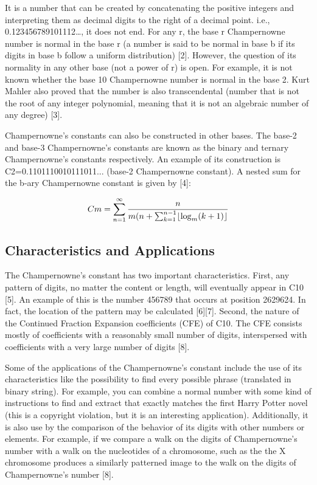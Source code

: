 \documentclass{report}
\begin{document}
It is a number that can be created by concatenating the positive integers and interpreting them as decimal digits to the right of a decimal point. i.e., 0.123456789101112…, it does not end. For any r, the base r Champernowne number is normal in the base r (a number is said to be normal in base b if its digits in base b follow a uniform distribution) [2]. However, the question of its normality in any other base (not a power of r) is open. For example, it is not known whether the base 10 Champernowne number is normal in the base 2. Kurt Mahler also proved that the number is also transcendental (number that is not the root of any integer polynomial, meaning that it is not an algebraic number of any degree) [3]. 

Champernowne’s constants can also be constructed in other bases. The base-2 and base-3 Champernowne’s constants are known as the binary and ternary Champernowne’s constants respectively. An example of its construction is C2=0.1101110010111011... (base-2 Champernowne constant). A nested sum for the b-ary Champernowne constant is given by [4]:

\begin {equation}
Cm=\sum_{n=1}^{\infty} \frac {n}{m (n + \sum_{k=1}^{n-1}\floor*{\log_{m}(k+1)}}
\end{equation}

\subsection{Characteristics and Applications} %

The Champernowne’s constant has two important characteristics. First, any pattern of digits, no matter the content or length, will eventually appear in C10 [5].  An example of this is the number 456789 that occurs at position 2629624. In fact, the location of the pattern may be calculated [6][7]. Second, the nature of the Continued Fraction Expansion coefficients (CFE) of C10. The CFE consists mostly of coefficients with a reasonably small number of digits, interspersed with coefficients with a very large number of digits [8].

Some of the applications of the Champernowne’s constant include the use of its characteristics like the possibility to find every possible phrase (translated in binary string). For example, you can combine a normal number with some kind of instructions to find and extract that exactly matches the first Harry Potter novel (this is a copyright violation, but it is an interesting application). Additionally, it is also use by the comparison of the behavior of its digits with other numbers or elements. For example, if we compare a walk on the digits of Champernowne’s number with a walk on the nucleotides of a chromosome, such as the the X chromosome produces a similarly patterned image to the walk on the digits of Champernowne’s number [8].
\end{document}
